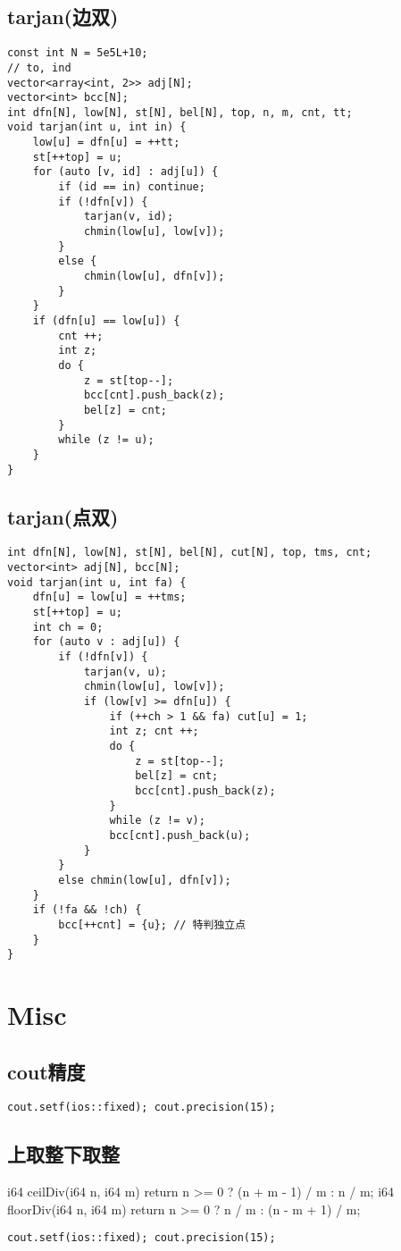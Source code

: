 \documentclass[a4paper,landscape,twocolumn]{ctexart}
\begin{document}
\subsection{tarjan(边双)}

\begin{lstlisting}
const int N = 5e5L+10;
// to, ind
vector<array<int, 2>> adj[N];
vector<int> bcc[N];
int dfn[N], low[N], st[N], bel[N], top, n, m, cnt, tt;
void tarjan(int u, int in) {
	low[u] = dfn[u] = ++tt;
	st[++top] = u;
	for (auto [v, id] : adj[u]) {
		if (id == in) continue;
		if (!dfn[v]) {
			tarjan(v, id);
			chmin(low[u], low[v]);
		}
		else {
			chmin(low[u], dfn[v]);
		}
	}
	if (dfn[u] == low[u]) {
		cnt ++;
		int z;
		do {
			z = st[top--];
			bcc[cnt].push_back(z);
			bel[z] = cnt;
		}
		while (z != u);
	}
}
\end{lstlisting}

\subsection{tarjan(点双)}

\begin{lstlisting}
int dfn[N], low[N], st[N], bel[N], cut[N], top, tms, cnt;
vector<int> adj[N], bcc[N];
void tarjan(int u, int fa) {
	dfn[u] = low[u] = ++tms;
	st[++top] = u;
	int ch = 0;
	for (auto v : adj[u]) {
		if (!dfn[v]) {
			tarjan(v, u);
			chmin(low[u], low[v]);
			if (low[v] >= dfn[u]) {
				if (++ch > 1 && fa) cut[u] = 1;
				int z; cnt ++;
				do {
					z = st[top--];
					bel[z] = cnt;
					bcc[cnt].push_back(z);
				}
				while (z != v);
				bcc[cnt].push_back(u);
			}
		}
		else chmin(low[u], dfn[v]);
	}
	if (!fa && !ch) {
		bcc[++cnt] = {u}; // 特判独立点
	}
}
\end{lstlisting}

\section{Misc}

\subsection{cout精度}

\begin{lstlisting}
cout.setf(ios::fixed); cout.precision(15);
\end{lstlisting}

\subsection{上取整下取整}
i64 ceilDiv(i64 n, i64 m) {
	return n >= 0 ? (n + m - 1) / m : n / m;
}
i64 floorDiv(i64 n, i64 m) {
	return n >= 0 ? n / m : (n - m + 1) / m;
}
\begin{lstlisting}
cout.setf(ios::fixed); cout.precision(15);
\end{lstlisting}
\end{document}
